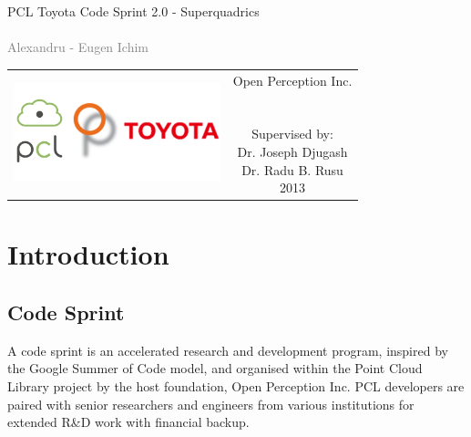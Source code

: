 \documentclass{article}
\begin{document}
\begin{titlepage}
\begin{center}
\sffamily


\null\vspace{2cm}
{\huge PCL Toyota Code Sprint 2.0 - Superquadrics} \\[24pt] 
\textcolor{gray}{{\\ Alexandru - Eugen Ichim}}
    
\vfill

\begin{tabular} {cc}
\hspace{1cm}
\parbox{0.4\textwidth}{\includegraphics[width=6cm]{figures/logos}}
\hspace{4cm}
&
\parbox{0.7\textwidth}{%
	Open Perception Inc. \\ \\ \\
%
\small
Supervised by:\\[4pt]
%
    Dr. Joseph Djugash\\
    Dr. Radu B. Rusu\\[12pt]
%
2013}
\end{tabular}
\end{center}
\vspace{2cm}
\end{titlepage}



\tableofcontents
\newpage

\section {Introduction}

\subsection {Code Sprint}
A code sprint is an accelerated research and development program, inspired by the Google Summer of Code model, and organised within the Point Cloud Library project by the host foundation, Open Perception Inc. PCL developers are paired with senior researchers and engineers from various institutions for extended R\&D work with financial backup.
\end{document}
